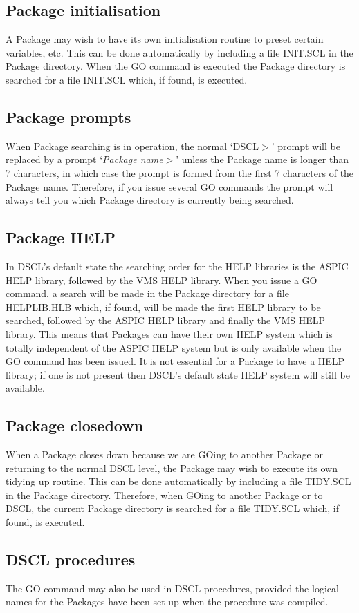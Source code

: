 \subsection {Package initialisation}
A Package may wish to have its own initialisation routine to preset certain
variables, etc.
This can be done automatically by including a file INIT.SCL in the Package
directory.
When the GO command is executed the Package directory is searched for a file
INIT.SCL which, if found, is executed.
\subsection {Package prompts}
When Package searching is in operation, the normal `DSCL$>$' prompt will be
replaced by a prompt `{\em Package name}$>$' unless the Package name is longer than
7 characters, in which case the prompt is formed from the first 7 characters of
the Package name.
Therefore, if you issue several GO commands the prompt will always tell you
which Package directory is currently being searched.
\subsection {Package HELP}
In DSCL's default state the searching order for the HELP libraries is the ASPIC
HELP library, followed by the VMS HELP library.
When you issue a GO command, a search will be made in the Package
directory for a file HELPLIB.HLB which, if found, will be made the first HELP
library to be searched, followed by the ASPIC HELP library and finally the VMS
HELP library.
This means that Packages can have their own HELP system which is totally
independent of the ASPIC HELP system but is only available when the GO command
has been issued.
It is not essential for a Package to have a HELP library; if one is
not present then DSCL's default state HELP system will still be available.
\subsection {Package closedown}
When a Package closes down because we are GOing to another Package or returning
to the normal DSCL level, the Package may wish to execute its own tidying up
routine.
This can be done automatically by including a file TIDY.SCL in the Package
directory.
Therefore, when GOing to another Package or to DSCL, the current Package
directory is searched for a file TIDY.SCL which, if found, is executed.
\subsection {DSCL procedures}
The GO command may also be used in DSCL procedures, provided the logical names
for the Packages have been set up when the procedure was compiled.

